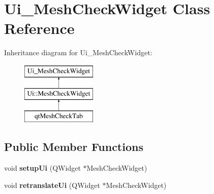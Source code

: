 \hypertarget{class_ui___mesh_check_widget}{}\section{Ui\+\_\+\+Mesh\+Check\+Widget Class Reference}
\label{class_ui___mesh_check_widget}
Inheritance diagram for Ui\+\_\+\+Mesh\+Check\+Widget\+:\begin{figure}[H]
\begin{center}
\leavevmode
\includegraphics[height=3.000000cm]{class_ui___mesh_check_widget}
\end{center}
\end{figure}
\subsection*{Public Member Functions}
\begin{DoxyCompactItemize}
\item 
\hypertarget{class_ui___mesh_check_widget_ab496ad21888202c30dd609a009784854}{}void {\bfseries setup\+Ui} (Q\+Widget $\ast$Mesh\+Check\+Widget)\label{class_ui___mesh_check_widget_ab496ad21888202c30dd609a009784854}

\item 
\hypertarget{class_ui___mesh_check_widget_a0ebb651ca156d28f9b512514a1efe86c}{}void {\bfseries retranslate\+Ui} (Q\+Widget $\ast$Mesh\+Check\+Widget)\label{class_ui___mesh_check_widget_a0ebb651ca156d28f9b512514a1efe86c}

\end{DoxyCompactItemize}
